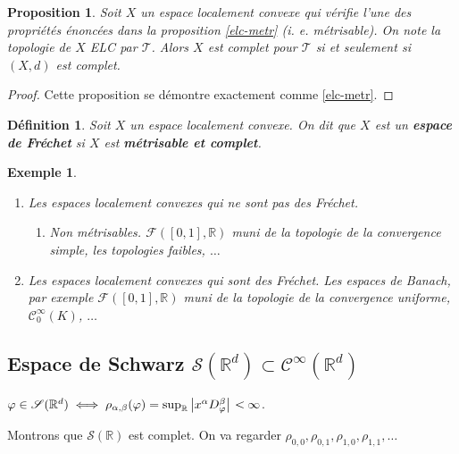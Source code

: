 \documentclass[french]{book}
\newtheorem{prop}{Proposition}[section]
\newtheorem{definition}{Définition}[section]
\newtheorem{exemple}{Exemple}
\newcommand{\lesss}{\rotatebox[origin=c]{90}{$\land$}}
\newcommand{\less}{\ \lesss\ }
\begin{document}
\begin{prop}
  Soit \(X\) un espace localement convexe qui vérifie l'une des propriétés énoncées dans la proposition \ref{elc-metr} (i. e. métrisable). On note la topologie de \(X\) ELC par \(\mathscr{T}\). Alors \(X\) est complet pour \(\mathscr{T}\) si et seulement si \((X,d)\) est complet.
\end{prop}

\begin{proof}
  Cette proposition se démontre exactement comme \ref{elc-metr}.
\end{proof}

\begin{definition}
  Soit \(X\) un espace localement convexe. On dit que \(X\) est un \textbf{espace de Fréchet} si \(X\) est \textbf{métrisable et complet}.
\end{definition}

\begin{exemple}

  \

  \begin{enumerate}
    \item \emph{Les espaces localement convexes qui ne sont pas des Fréchet. }
    \begin{enumerate}
      \item \emph{Non métrisables.} \(\mathscr{F}([0, 1], \mathbb{R}) \) muni de la topologie de la convergence simple, les topologies faibles, \(\dots\)
    \end{enumerate}

    \item \emph{Les espaces localement convexes qui sont des Fréchet. } Les espaces de Banach, par exemple \(\mathscr{F}([0, 1], \mathbb{R}) \) muni de la topologie de la convergence uniforme, \(\mathcal{C}^{\infty}_0(K)\), \(\dots\)
  \end{enumerate}
\end{exemple}

\subsection{Espace de Schwarz \(\mathscr{S}(\mathbb{R} ^{d}) \subset \mathcal{C}^\infty(\mathbb{R}^d)\)}

\(\varphi \in \mathscr{S}(\mathbb{R}^d) \iff \rho _{\alpha, \beta}(\varphi) = \sup_{ \mathbb{R} } \left\lvert x ^{\alpha} D _{\varphi} ^{\beta} \right\rvert \less \infty\).

Montrons que \(\mathscr{S}(\mathbb{R})\) est complet. On va regarder \(\rho _{0, 0}, \rho _{0, 1}, \rho _{1, 0}, \rho _{1, 1}, \dots\)
\end{document}
